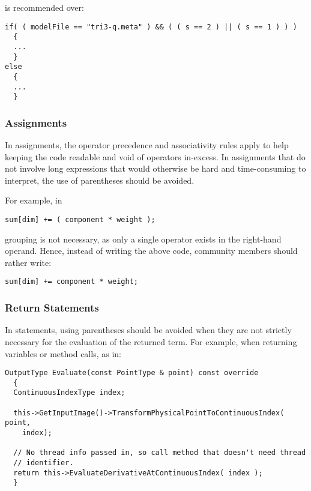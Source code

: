 is recommended over:

\small
\begin{verbatim}
if( ( modelFile == "tri3-q.meta" ) && ( ( s == 2 ) || ( s == 1 ) ) )
  {
  ...
  }
else
  {
  ...
  }
\end{verbatim}
\normalsize


\subsubsection{Assignments}
\label{subsubsec:Assignments}

In assignments, the operator precedence and associativity rules apply to help
keeping the code readable and void of operators in-excess. In assignments that
do not involve long expressions that would otherwise be hard and time-consuming
to interpret, the use of parentheses should be avoided.

For example, in

\small
\begin{verbatim}
sum[dim] += ( component * weight );
\end{verbatim}
\normalsize

grouping is not necessary, as only a single operator exists in the right-hand
operand. Hence, instead of writing the above code, community members should
rather write:

\small
\begin{verbatim}
sum[dim] += component * weight;
\end{verbatim}
\normalsize


\subsubsection{Return Statements}
\label{subsubsec:ReturnStatements}

In  statements, using parentheses should be avoided when they
are not strictly necessary for the evaluation of the returned term. For example,
when returning variables or method calls, as in:

\small
\begin{verbatim}
OutputType Evaluate(const PointType & point) const override
  {
  ContinuousIndexType index;

  this->GetInputImage()->TransformPhysicalPointToContinuousIndex( point,
    index);

  // No thread info passed in, so call method that doesn't need thread
  // identifier.
  return this->EvaluateDerivativeAtContinuousIndex( index );
  }
\end{verbatim}
\normalsize

